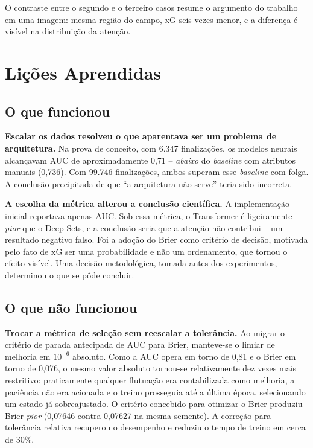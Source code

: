\documentclass[12pt]{article}
\begin{document}
O contraste entre o segundo e o terceiro casos resume o argumento do trabalho em
uma imagem: mesma região do campo, xG seis vezes menor, e a diferença é visível
na distribuição da atenção.



\section{Lições Aprendidas}

\subsection{O que funcionou}

\textbf{Escalar os dados resolveu o que aparentava ser um problema de
arquitetura.} Na prova de conceito, com 6.347 finalizações, os modelos neurais
alcançavam AUC de aproximadamente 0,71 -- \emph{abaixo} do \emph{baseline} com
atributos manuais (0,736). Com 99.746 finalizações, ambos superam esse
\emph{baseline} com folga. A conclusão precipitada de que ``a arquitetura não
serve'' teria sido incorreta.

\textbf{A escolha da métrica alterou a conclusão científica.} A implementação
inicial reportava apenas AUC. Sob essa métrica, o Transformer é ligeiramente
\emph{pior} que o Deep Sets, e a conclusão seria que a atenção não contribui --
um resultado negativo falso. Foi a adoção do Brier como critério de decisão,
motivada pelo fato de xG ser uma probabilidade e não um ordenamento, que tornou o
efeito visível. Uma decisão metodológica, tomada antes dos experimentos,
determinou o que se pôde concluir.

\subsection{O que não funcionou}

\textbf{Trocar a métrica de seleção sem reescalar a tolerância.} Ao migrar o
critério de parada antecipada de AUC para Brier, manteve-se o limiar de melhoria
em $10^{-6}$ absoluto. Como a AUC opera em torno de 0,81 e o Brier em torno de
0,076, o mesmo valor absoluto tornou-se relativamente dez vezes mais restritivo:
praticamente qualquer flutuação era contabilizada como melhoria, a paciência não
era acionada e o treino prosseguia até a última época, selecionando um estado já
sobreajustado. O critério concebido para otimizar o Brier produziu Brier
\emph{pior} (0,07646 contra 0,07627 na mesma semente). A correção para tolerância
relativa recuperou o desempenho e reduziu o tempo de treino em cerca de 30\%.
\end{document}
